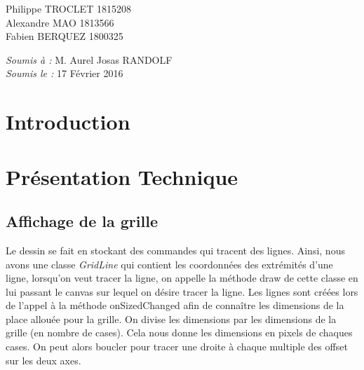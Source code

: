 \documentclass[12pt, a4paper]{article}
\begin{document}
\begin{titlepage}
\begin{sffamily}
\begin{center}
    \begin{minipage}{0.4\textwidth}
      \begin{flushleft} \large
          Philippe TROCLET \textsc{1815208}\\
          Alexandre  MAO \textsc{1813566}\\
          Fabien  BERQUEZ \textsc{1800325}\\
      \end{flushleft}
    \end{minipage}
    \begin{minipage}{0.4\textwidth}
      \begin{flushright} \large
        \emph{Soumis à :} M. Aurel Josas RANDOLF\\
        \emph{Soumis le :} 17 Février 2016 
      \end{flushright}
    \end{minipage}

    \vfill

  \end{center}
  \end{sffamily}
\end{titlepage}


\section{Introduction}
\section{Présentation Technique}
    \subsection{Affichage de la grille}
    Le dessin se fait en stockant des commandes qui tracent des lignes. Ainsi, nous avons une classe \textit{GridLine} qui
    contient les coordonnées des extrémités d'une ligne, lorsqu'on veut tracer la ligne, on appelle la méthode draw de cette
    classe en lui passant le canvas sur lequel on désire tracer la ligne. Les lignes sont créées lors de l'appel à la méthode
    onSizedChanged afin de connaître les dimensions de la place allouée pour la grille. On divise les dimensions par les
    dimensions de la grille (en nombre de cases). Cela nous donne les dimensions en pixels de chaques cases. On peut alors boucler
    pour tracer une droite à chaque multiple des offset sur les deux axes.
\end{document}
